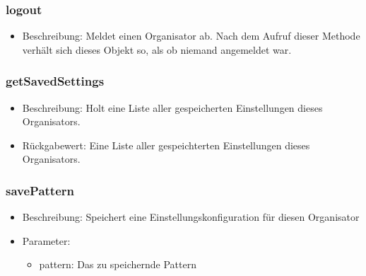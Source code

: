 \documentclass[a4paper]{scrreprt}
\begin{document}
    \subsubsection{logout}
    \begin{itemize}
        \item Beschreibung: Meldet einen Organisator ab. Nach dem Aufruf dieser Methode verhält sich dieses Objekt so, als ob niemand angemeldet war.
    \end{itemize}
    \subsubsection{getSavedSettings}
    \begin{itemize}
        \item Beschreibung: Holt eine Liste aller gespeicherten Einstellungen dieses Organisators.
        \item Rückgabewert: Eine Liste aller gespeichterten Einstellungen dieses Organisators. 
    \end{itemize}
    \subsubsection{savePattern}
    \begin{itemize}
        \item Beschreibung: Speichert eine Einstellungskonfiguration für diesen Organisator
        \item Parameter:
        \begin{itemize}
            \item pattern: Das zu speichernde Pattern
        \end{itemize}
    \end{itemize}

\end{document}
